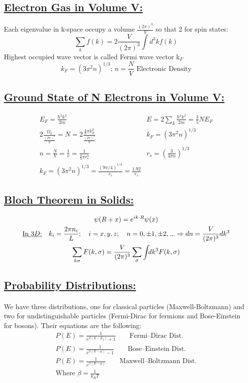 \documentclass[a4paper,12pt]{article}
\begin{document}
\subsection*{\underline{Electron Gas in Volume V:}}
Each eigenvalue in k-space occupy a volume $\frac{{(2\pi)^3}}{V}$ so that 2 for spin states:
\begin{equation} \sum_k f(k)=2\frac{V}{(2\pi)^3}\int d^3k f(k) \end{equation}
Highest occupied wave vector is called Fermi wave vector k$_F$ 
\begin{equation} k_F = (3\pi^2n)^{1/3}; \, n=\frac{N}{V} \,\, \text{Electronic Density}\end{equation}
\subsection*{\underline{Ground State of N Electrons in Volume V:}}

\begin{align}
&E_F=\frac{\hbar^2k^2}{2m}
&E=2\sum_k\frac{\hbar^2k^2}{2m}=\frac{3}{5}NE_F
&\\
&2\frac{\Omega_k}{\frac{(2\pi)^3}{V}}=N=2\frac{\frac{4}{3}\pi k_F^3}{\frac{(2\pi)^3}{V}}
& k_F = (3\pi^2n)^{1/3}
&\\
&n=\frac{N}{V}=\frac{1}{v}=\frac{1}{\frac{4}{3}\pi r_s^3}
&r_s=\left(\frac{3}{4\pi n}\right)^{1/3}
&\\
& k_F = (3\pi^2n)^{1/3} = \frac{(9\pi /4)^{1/3}}{r_s}=\frac{1.92}{r_s}
\end{align}
\subsection*{\underline{Bloch Theorem in Solids:}}
\begin{gather}
\psi (R+x)=e^{i k\cdot R} \psi (x)\\
\text{\underline{In $3D$:}}\quad k_i = \frac{2\pi n_i}{L}; \quad i=x, y, z;\quad n=0, \pm1, \pm 2, ... \Rightarrow dn = \frac{V}{(2\pi)^3} dk^3\\
\sum_{k\sigma}F(k, \sigma)= \frac{V}{(2\pi)^3} \sum_\sigma \int_{}  d k^3 F(k, \sigma)
\end{gather}
\subsection*{\underline{Probability Distributions:}}
\paragraph{}We have three distributions, one for classical particles (Maxwell-Boltzmann) and two for undistinguishable particles (Fermi-Dirac for fermions and Bose-Einstein for bosons). Their equations are the following:
\begin{gather}
P(E)=\frac{1}{e^{\beta(E -E_f)}+1} \qquad \text{Fermi--Dirac Dist.}\\
P(E)=\frac{1}{e^{\beta(E -\mu)}-1} \qquad \text{Bose--Einstein Dist.}\\
P(E)=\frac{1}{e^{\beta(E -\mu)}} \qquad \text{Maxwell--Boltzmann Dist.}\\
\text{Where $\beta=\frac{1}{k_B T}$}
\end{gather}
\end{document}
